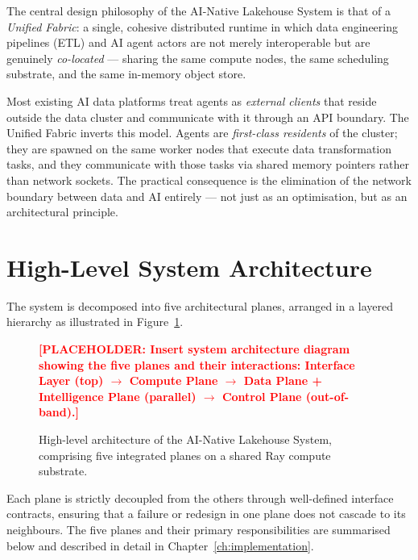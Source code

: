 \documentclass[12pt, a4paper]{report}
\newcommand{\placeholder}[1]{%
  \textcolor{red}{\textbf{[PLACEHOLDER: #1]}}%
}
\begin{document}
The central design philosophy of the AI-Native Lakehouse System is that of a
\emph{Unified Fabric}: a single, cohesive distributed runtime in which data engineering
pipelines (ETL) and AI agent actors are not merely interoperable but are genuinely
\emph{co-located} — sharing the same compute nodes, the same scheduling substrate, and
the same in-memory object store.

Most existing AI data platforms treat agents as \emph{external clients} that reside
outside the data cluster and communicate with it through an API boundary.
The Unified Fabric inverts this model.
Agents are \emph{first-class residents} of the cluster; they are spawned on the same
worker nodes that execute data transformation tasks, and they communicate with those tasks
via shared memory pointers rather than network sockets.
The practical consequence is the elimination of the network boundary between data and AI
entirely — not just as an optimisation, but as an architectural principle.

\section{High-Level System Architecture}
\label{sec:highlevel}

The system is decomposed into five architectural planes, arranged in a layered hierarchy
as illustrated in Figure~\ref{fig:system_architecture}.

\begin{figure}[H]
  \centering
  \placeholder{Insert system architecture diagram showing the five planes and their
  interactions: Interface Layer (top) $\rightarrow$ Compute Plane $\rightarrow$
  Data Plane + Intelligence Plane (parallel) $\rightarrow$ Control Plane (out-of-band).}
  \caption{High-level architecture of the AI-Native Lakehouse System, comprising five
  integrated planes on a shared Ray compute substrate.}
  \label{fig:system_architecture}
\end{figure}

Each plane is strictly decoupled from the others through well-defined interface contracts,
ensuring that a failure or redesign in one plane does not cascade to its neighbours.
The five planes and their primary responsibilities are summarised below and described
in detail in Chapter~\ref{ch:implementation}.
\end{document}
